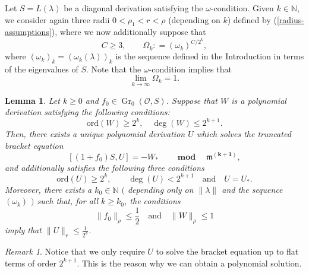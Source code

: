 \documentclass[10pt,twoside,reqno]{amsart}
\newtheorem{lemma}[thm]{Lemma}
\theoremstyle{remark}
\theoremstyle{remark}
\newtheorem{remark}[thm]{Remark}
\newcommand{\OO}{\mathcal{O}}
\newcommand{\tmmathbf}[1]{{\boldsymbol{#1}}}
\newcommand{\tmop}[1]{{\operatorname{#1}}}
\newcommand{\Gr}{\operatorname{Gr}}
\newcommand{\ord}{\mathrm{ord}}
\begin{document}
Let $S=L(\lambda)$ be a diagonal derivation satisfying the $\omega$-condition. Given $k \in \mathbb{N}$, we consider again three radii $0 < \rho_1
< r < \rho$ (depending on $k$) defined by (\ref{radius-assumptions}), where we now additionally suppose that
$$C \ge 3,\qquad \Omega_k : = (\omega_k)^{C / 2^k},$$ 
where $(\omega_k)_k = (\omega_k(\lambda))_k$ is the sequence defined in the Introduction in terms of the eigenvalues of $S$. 
Note that the $\omega$-condition implies that
$$\lim_{k \rightarrow \infty} \Omega_k = 1.$$ 
\begin{lemma}\label{lemma-bound-bracket-equation}
  Let $k\geq 0$ and $f_0 \in \Gr_0(\OO,S)$. Suppose that $W$ is a polynomial derivation satisfying the following conditions:
  \[ \ord (W) \geqslant 2^k, \quad \deg (W) \le 2^{k + 1}. \]
  Then, there exists a unique polynomial derivation $U$ which solves the truncated
  bracket equation
  \begin{equation}\label{truncated-bracket-eq}
  [(1 + f_0) S, U] = - W_{\ast} \qquad \tmmathbf{\tmop{mod} \quad
     \mathfrak{m}^{(k + 1)}} ,
  \end{equation}
  and {{additionally}} satisfies the following three conditions
  \[ \ord (U) \geqslant 2^k,\qquad \deg (U) < 2^{k + 1}\quad \text{and} \quad U =
     U_{\ast} .\]
  Moreover, there exists a $k_0 \in \mathbb{N}$ $($ depending only on
  $\| \lambda \|$ and the sequence $(\omega_k)$ $)$ such that, for all $k \geqslant k_0$, the conditions
  \[ \| f_0 \|_{\rho} \leqslant \frac{1}{2} \quad\text{and}\quad \| W \|_{\rho}
     \leqslant 1   \]
imply that $\| U \|_r \leqslant \frac{1}{2^k}$. 
\end{lemma}
\noindent 
\begin{remark}
Notice that we only require $U$ to solve the bracket equation up to flat terms of order $2^{k+1}$.  This is the reason why we can obtain a polynomial solution. 
\end{remark}
\end{document}
